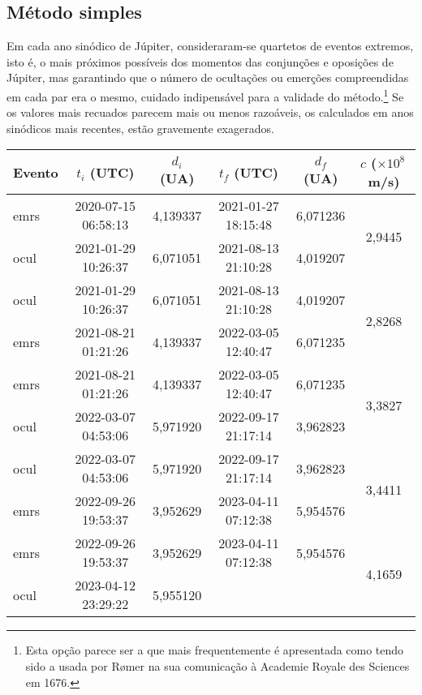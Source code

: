 \documentclass[]{article}
\begin{document}
\subsection{Método simples}
Em cada ano
sinódico de Júpiter, consideraram-se quartetos de eventos extremos, isto é, o
mais próximos possíveis dos momentos das conjunções e oposições de Júpiter, mas
garantindo que o número de ocultações ou emerções compreendidas em cada par era
o mesmo, cuidado indipensável para a validade do método.\footnote{Esta opção
  parece ser a que mais frequentemente é apresentada como tendo sido a usada por
R{\o}mer na sua comunicação à Academie Royale des Sciences em 1676.} Se os valores mais recuados
parecem mais ou menos razoáveis, os calculados em anos sinódicos mais recentes,
estão gravemente exagerados.
\begin{table}[htb]
  \begin{center}
    \begin{tabular}{lccccc}
      \hline
      Evento &  $t_i$ (UTC) & $d_i$ (UA) & $t_f$ (UTC) & $d_f$ (UA) & $c$
      ($\times10^8$\,m/s)\\
      \hline
      emrs  & 2020-07-15 06:58:13 & 4,139337   
            & 2021-01-27 18:15:48 & 6,071236  
            & \multirow{2}{*}{2,9445}\\
      ocul  & 2021-01-29 10:26:37 & 6,071051  
            & 2021-08-13 21:10:28 & 4,019207 \\
      \hline
      ocul  & 2021-01-29 10:26:37 & 6,071051  
            & 2021-08-13 21:10:28 & 4,019207 
            & \multirow{2}{*}{2,8268}\\
      emrs  & 2021-08-21 01:21:26 & 4,139337
            & 2022-03-05 12:40:47 & 6,071235\\
      \hline
      emrs  & 2021-08-21 01:21:26 & 4,139337
            & 2022-03-05 12:40:47 & 6,071235
            & \multirow{2}{*}{3,3827}\\
      ocul  & 2022-03-07 04:53:06 & 5,971920
            & 2022-09-17 21:17:14 & 3,962823\\
      \hline
      ocul  & 2022-03-07 04:53:06 & 5,971920
            & 2022-09-17 21:17:14 & 3,962823
            & \multirow{2}{*}{3,4411}\\
      emrs  & 2022-09-26 19:53:37 & 3,952629
            & 2023-04-11 07:12:38 & 5,954576\\
      \hline
      emrs  & 2022-09-26 19:53:37 & 3,952629
            & 2023-04-11 07:12:38 & 5,954576
            & \multirow{2}{*}{4,1659}\\
      ocul  & 2023-04-12 23:29:22 & 5,955120

\end{tabular}
\end{center}
\end{table}
\end{document}
